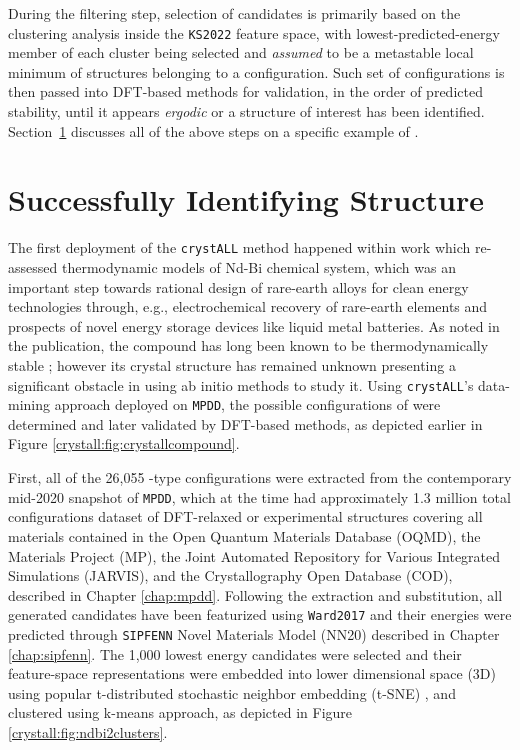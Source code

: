 During the filtering step, selection of candidates is primarily based on the clustering analysis inside the \texttt{KS2022} feature space, with lowest-predicted-energy member of each cluster being selected and \emph{assumed} to be a metastable local minimum of structures belonging to a configuration. Such set of configurations is then passed into DFT-based methods for validation, in the order of predicted stability, until it appears \emph{ergodic} or a structure of interest has been identified. Section~\ref{crystall:ndbi2} discusses all of the above steps on a specific example of .


\section{Successfully Identifying  Structure} \label{crystall:ndbi2}

The first deployment of the \texttt{crystALL} method happened within \citet{Im2022ThermodynamicModeling} work which re-assessed thermodynamic models of Nd-Bi chemical system, which was an important step towards rational design of rare-earth alloys for clean energy technologies through, e.g., electrochemical recovery of rare-earth elements and prospects of novel energy storage devices like liquid metal batteries. As noted in the publication, the  compound has long been known to be thermodynamically stable \cite{Yoshihara1975Rare-earthBismuthides}; however its crystal structure has remained unknown presenting a significant obstacle in using ab initio methods to study it. Using \texttt{crystALL}'s data-mining approach deployed on \texttt{MPDD}, the possible configurations of  were determined and later validated by DFT-based methods, as depicted earlier in Figure \ref{crystall:fig:crystallcompound}.

First, all of the 26,055 -type configurations were extracted from the contemporary mid-2020 snapshot of \texttt{MPDD}, which at the time had approximately 1.3 million total configurations dataset of DFT-relaxed or experimental structures covering all materials contained in the Open Quantum Materials Database (OQMD), the Materials Project (MP), the Joint Automated Repository for Various Integrated Simulations (JARVIS), and the Crystallography Open Database (COD), described in Chapter \ref{chap:mpdd}. Following the extraction and substitution, all generated candidates have been featurized using \texttt{Ward2017} \cite{Ward2017IncludingTessellations} and their energies were predicted through \texttt{SIPFENN} Novel Materials Model (NN20) described in Chapter \ref{chap:sipfenn}. The 1,000 lowest energy candidates were selected and their feature-space representations were embedded into lower dimensional space (3D) using popular t-distributed stochastic neighbor embedding (t-SNE) \cite{HintonStochasticEmbedding}, and clustered using k-means approach, as depicted in Figure \ref{crystall:fig:ndbi2clusters}.

